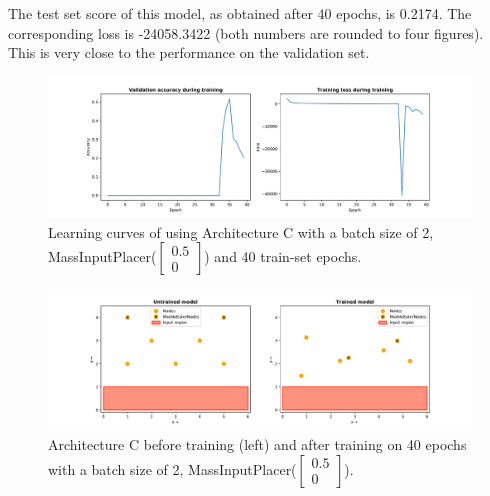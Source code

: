 The test set score of this model, as obtained after 40 epochs, is 0.2174.
The corresponding loss is -24058.3422 (both numbers are rounded to four figures). 
This is very close to the performance on the validation set. 

\begin{figure}[hb]
	\centering
	\includegraphics[scale=0.4]{figures/C_batch1_ConstVelInputPlacer([0.5, 0]])_epoch40_stats.pdf}
	\caption{Learning curves of using Architecture C with 
		a batch size of 2, MassInputPlacer($\begin{bmatrix} 0.5\\0\end{bmatrix}$) and 40 train-set epochs.}
	\label{fig:arch_c_const_vel_50pc_learning_curve}
\end{figure}

\begin{figure}[hb]
	\centering
	\includegraphics[scale=0.4]{figures/C_batch1_ConstVelInputPlacer([0.5, 0]])_epoch40.pdf}
	\caption{Architecture C before training (left) and after training on 40 epochs with 
		a batch size of 2, MassInputPlacer($\begin{bmatrix} 0.5\\0\end{bmatrix}$).}
	\label{fig:arch_c_const_vel_50pc_architecture}
\end{figure}

\clearpage